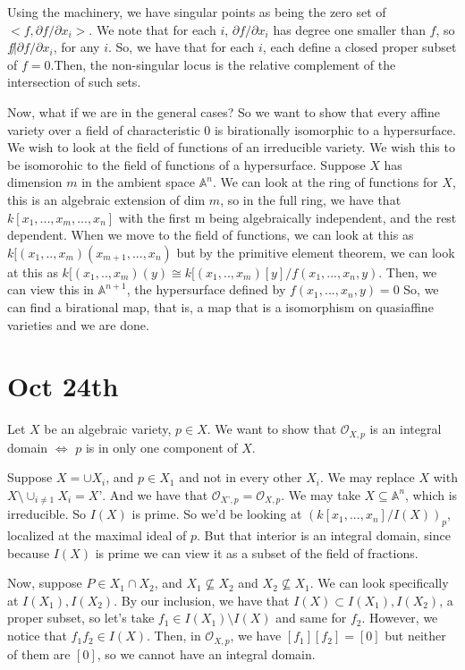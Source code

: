 \documentclass[10pt]{article}
\begin{document}
Using the machinery, we have singular points as being the zero set of $< f, \partial f / \partial x_i >$. We note that for each $i$, $\partial f / \partial x_i$ has degree one smaller than $f$, so $f \not | \partial f / \partial x_i$, for any $i$. So, we have that for each $i$, each define a closed proper subset of $f = 0$.Then, the non-singular locus is the relative complement of the intersection of such sets.

Now, what if we are in the general cases? So we want to show that every affine variety over a field of characteristic 0 is birationally isomorphic to a hypersurface. We wish to look at the field of functions of an irreducible variety. We wish this to be isomorohic to the field of functions of a hypersurface. Suppose $X$ has dimension $m$ in the ambient space $\mathbb{A}^n$. We can look at the ring of functions for $X$, this is an algebraic extension of dim $m$, so in the full ring, we have that $k[x_1,...,x_m,...,x_n]$ with the first m being algebraically independent, and the rest dependent. When we move to the field of functions, we can look at this as $k[(x_1,..,x_m)(x_{m+1},...,x_n)$ but by the primitive element theorem, we can look at this as $k[(x_1,..,x_m)(y) \cong k[(x_1,..,x_m)[y]/f(x_1,...,x_n,y)$. Then, we can view this in $\mathbb{A}^{n+1}$, the hypersurface defined by $f(x_1,...,x_n,y) = 0$ So, we can find a birational map, that is, a map that is a isomorphism on quasiaffine varieties and we are done.

\section{Oct 24th}

Let $X$ be an algebraic variety, $p \in X$. We want to show that $\mathcal{O}_{X,p}$ is an integral domain $\iff$ $p$ is in only one component of $X$.

Suppose $X = \cup X_i$, and $p \in X_1$ and not in every other $X_i$. We may replace $X$ with $X \setminus \cup_{i \not = 1} X_i  = X’$. And we have that $\mathcal{O}_{X’,p} = \mathcal{O}_{X,p}$. We may take $X \subseteq \mathbb{A}^n$, which is irreducible. So $I(X)$ is prime. So we’d be looking at $(k[x_1,...,x_n]/I(X))_p$, localized at the maximal ideal of $p$. But that interior is an integral domain, since because $I(X)$ is prime we can view it as a subset of the field of fractions.

Now, suppose $P \in X_1 \cap X_2$, and $X_1 \not \subseteq X_2$ and $X_2 \not \subseteq X_1$. We can look specifically at $I(X_1), I(X_2)$. By our inclusion, we have that $I(X) \subset I(X_1), I(X_2)$, a proper subset, so let’s take $f_1 \in I(X_1) \setminus I(X)$ and same for $f_2$. However, we notice that $f_1 f_2 \in I(X)$. Then, in $\mathcal{O}_{X,p}$, we have $[f_1][f_2] = [0]$ but neither of them are $[0]$, so we cannot have an integral domain.
\end{document}
